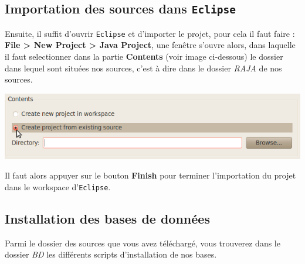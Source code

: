 \documentclass[12pt]{article}
\begin{document}
	\subsection{Importation des sources dans \texttt{Eclipse}}
	\indent Ensuite, il suffit d'ouvrir \texttt{Eclipse} et d'importer le projet, pour cela il faut faire : \textbf{File > New Project > Java Project}, une fenêtre s'ouvre alors, dans laquelle il faut selectionner dans la partie \textbf{Contents} (voir image ci-dessous) le dossier dans lequel sont situées nos sources, c'est à dire dans le dossier \textit{RAJA} de nos sources. 
	\begin{center}
	\includegraphics[scale=0.5]{Image/choisirProjet.png}
\end{center}

	Il faut alors appuyer sur le bouton \textbf{Finish} pour terminer l'importation du projet dans le workspace d'\texttt{Eclipse}. \\
	
	\subsection{Installation des bases de données}
	Parmi le dossier des sources que vous avez téléchargé, vous trouverez dans le dossier \textit{BD} les différents scripts d'installation de nos bases. 
\end{document}
